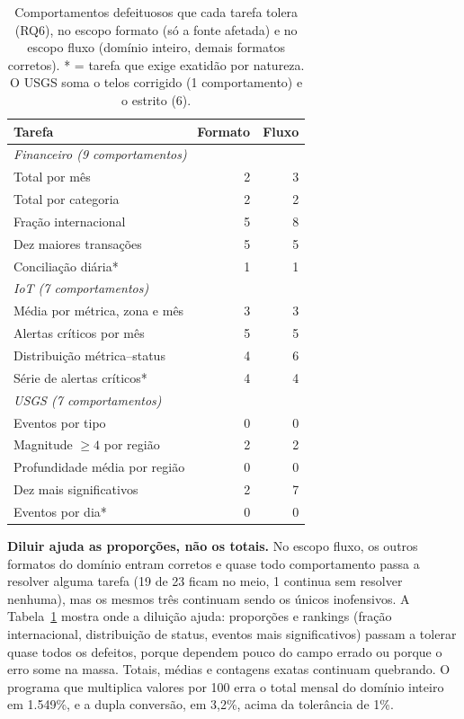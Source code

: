 \documentclass[sigconf,nonacm]{acmart}
\begin{document}
\begin{table}[t]
\caption{Comportamentos defeituosos que cada tarefa tolera (RQ6), no escopo formato (só a fonte afetada) e no escopo fluxo (domínio inteiro, demais formatos corretos). * = tarefa que exige exatidão por natureza. O USGS soma o telos corrigido (1 comportamento) e o estrito (6).}
\label{tab:rq6}
\small
\begin{tabular}{lrr}
\toprule
Tarefa & Formato & Fluxo \\
\midrule
\multicolumn{3}{l}{\textit{Financeiro (9 comportamentos)}} \\
Total por mês & 2 & 3 \\
Total por categoria & 2 & 2 \\
Fração internacional & 5 & 8 \\
Dez maiores transações & 5 & 5 \\
Conciliação diária* & 1 & 1 \\
\midrule
\multicolumn{3}{l}{\textit{IoT (7 comportamentos)}} \\
Média por métrica, zona e mês & 3 & 3 \\
Alertas críticos por mês & 5 & 5 \\
Distribuição métrica--status & 4 & 6 \\
Série de alertas críticos* & 4 & 4 \\
\midrule
\multicolumn{3}{l}{\textit{USGS (7 comportamentos)}} \\
Eventos por tipo & 0 & 0 \\
Magnitude $\geq 4$ por região & 2 & 2 \\
Profundidade média por região & 0 & 0 \\
Dez mais significativos & 2 & 7 \\
Eventos por dia* & 0 & 0 \\
\bottomrule
\end{tabular}
\end{table}

\textbf{Diluir ajuda as proporções, não os totais.} No escopo fluxo, os outros formatos do domínio entram corretos e quase todo comportamento passa a resolver alguma tarefa (19 de 23 ficam no meio, 1 continua sem resolver nenhuma), mas os mesmos três continuam sendo os únicos inofensivos. A Tabela~\ref{tab:rq6} mostra onde a diluição ajuda: proporções e rankings (fração internacional, distribuição de status, eventos mais significativos) passam a tolerar quase todos os defeitos, porque dependem pouco do campo errado ou porque o erro some na massa. Totais, médias e contagens exatas continuam quebrando. O programa que multiplica valores por 100 erra o total mensal do domínio inteiro em 1.549\%, e a dupla conversão, em 3,2\%, acima da tolerância de 1\%.
\end{document}
